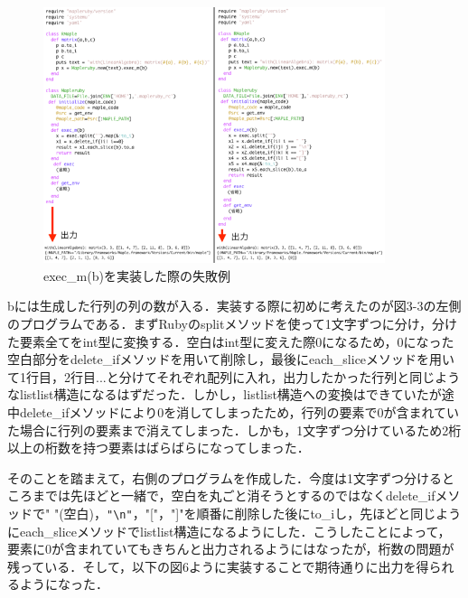 \begin{figure}[htbp]\begin{center}
\includegraphics[width=10cm,bb= 0 0 737 553]{../figs/./mapleruby_eringi.004.png}
\caption{exec\_m(b)を実装した際の失敗例}
\label{default}\end{center}\end{figure}
bには生成した行列の列の数が入る．実装する際に初めに考えたのが図3-3の左側のプログラムである．まずRubyのsplitメソッドを使って1文字ずつに分け，分けた要素全てをint型に変換する．空白はint型に変えた際0になるため，0になった空白部分をdelete\_ifメソッドを用いて削除し，最後にeach\_sliceメソッドを用いて1行目，2行目...と分けてそれぞれ配列に入れ，出力したかった行列と同じようなlistlist構造になるはずだった．しかし，listlist構造への変換はできていたが途中delete\_ifメソッドにより0を消してしまったため，行列の要素で0が含まれていた場合に行列の要素まで消えてしまった．しかも，1文字ずつ分けているため2桁以上の桁数を持つ要素はばらばらになってしまった．

そのことを踏まえて，右側のプログラムを作成した．今度は1文字ずつ分けるところまでは先ほどと一緒で，空白を丸ごと消そうとするのではなくdelete\_ifメソッドで" "(空白)，\verb|"\n"|，"["，"]"を順番に削除した後にto\_iし，先ほどと同じようにeach\_sliceメソッドでlistlist構造になるようにした．こうしたことによって，要素に0が含まれていてもきちんと出力されるようにはなったが，桁数の問題が残っている．そして，以下の図6ように実装することで期待通りに出力を得られるようになった．

